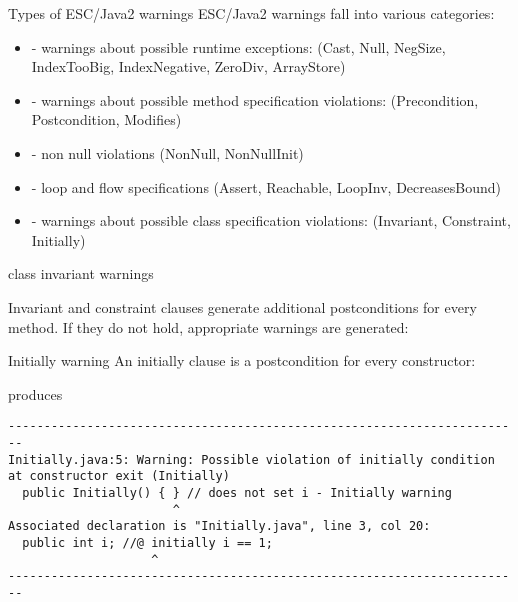 \documentclass[
pdf,
nocolorBG,
slideColor,
cok,
]{prosper}
\begin{document}
\begin{slide}{Types of ESC/Java2 warnings}
\vspace*{-6ex}
ESC/Java2 warnings fall into various categories:
\begin{itemize}
\item[] - {\gray warnings about possible { runtime exceptions}:
(Cast, Null, NegSize, IndexTooBig, IndexNegative, ZeroDiv, ArrayStore)}


\item[] - {\gray warnings about possible method { specification violations}:
(Precondition, Postcondition, Modifies)}

\item[] - {\gray non null violations (NonNull, NonNullInit)}

\item[] - {\gray loop and flow specifications (Assert, Reachable, LoopInv, DecreasesBound)}

\item[] - { warnings about possible class specification violations}:
(Invariant, Constraint, Initially)

\end{itemize}
\end{slide}
\begin{slide}{class invariant warnings}

\vspace*{-6ex}
Invariant and constraint clauses generate additional postconditions for every method.
If they do not hold, appropriate warnings are generated:

\begin{figure*}
\tiny

\end{figure*}
\end{slide}

\begin{slide}{Initially warning}
\vspace*{-6ex}
An initially clause is a postcondition for every constructor:

\begin{figure*}
\tiny

\end{figure*}
produces
\tiny
\begin{verbatim}
------------------------------------------------------------------------
Initially.java:5: Warning: Possible violation of initially condition 
at constructor exit (Initially)
  public Initially() { } // does not set i - Initially warning
                       ^
Associated declaration is "Initially.java", line 3, col 20:
  public int i; //@ initially i == 1;
                    ^
------------------------------------------------------------------------
\end{verbatim}
\end{slide}
\end{document}
